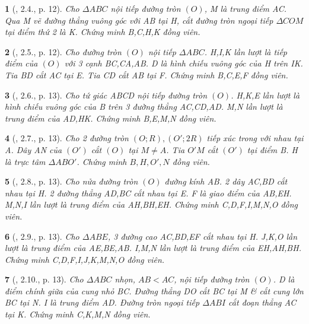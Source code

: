 \documentclass{article}
\newtheorem{baitoan}{}
\begin{document}
\begin{baitoan}[\cite{Thu_Chung_Viet_Minh_circ}, 2.4., p. 12]
	Cho $\Delta ABC$ nội tiếp đường tròn $(O)$, M là trung điểm AC. Qua M vẽ đường thẳng vuông góc với AB tại H, cắt đường tròn ngoại tiếp $\Delta COM$ tại điểm thứ 2 là K. Chứng minh B,C,H,K đồng viên.
\end{baitoan}

\begin{baitoan}[\cite{Thu_Chung_Viet_Minh_circ}, 2.5., p. 12]
	Cho đường tròn $(O)$ nội tiếp $\Delta ABC$. H,I,K lần lượt là tiếp điểm của $(O)$ với 3 cạnh BC,CA,AB. D là hình chiếu vuông góc của H trên IK. Tia BD cắt AC tại E. Tia CD cắt AB tại F. Chứng minh B,C,E,F đồng viên.
\end{baitoan}

\begin{baitoan}[\cite{Thu_Chung_Viet_Minh_circ}, 2.6., p. 13]
	Cho tứ giác ABCD nội tiếp đường tròn $(O)$. H,K,E lần lượt là hình chiếu vuông góc của B trên 3 đường thẳng AC,CD,AD. M,N lần lượt là trung điểm của AD,HK. Chứng minh B,E,M,N đồng viên.
\end{baitoan}

\begin{baitoan}[\cite{Thu_Chung_Viet_Minh_circ}, 2.7., p. 13]
	Cho 2 đường tròn $(O;R),(O';2R)$ tiếp xúc trong với nhau tại A. Dây AN của $(O')$ cắt $(O)$ tại $M\ne A$. Tia $O'M$ cắt $(O')$ tại điểm B. H là trực tâm $\Delta ABO'$. Chứng minh $B,H,O',N$ đồng viên.
\end{baitoan}

\begin{baitoan}[\cite{Thu_Chung_Viet_Minh_circ}, 2.8., p. 13]
	Cho nửa đường tròn $(O)$ đường kính AB. 2 dây AC,BD cắt nhau tại H. 2 đường thẳng AD,BC cắt nhau tại E. F là giao điểm của AB,EH. M,N,I lần lượt là trung điểm của AH,BH,EH. Chứng minh C,D,F,I,M,N,O đồng viên.
\end{baitoan}

\begin{baitoan}[\cite{Thu_Chung_Viet_Minh_circ}, 2.9., p. 13]
	Cho $\Delta ABE$, 3 đường cao AC,BD,EF cắt nhau tại H. J,K,O lần lượt là trung điểm của AE,BE,AB. I,M,N lần lượt là trung điểm của EH,AH,BH. Chứng minh C,D,F,I,J,K,M,N,O đồng viên.
\end{baitoan}

\begin{baitoan}[\cite{Thu_Chung_Viet_Minh_circ}, 2.10., p. 13]
	Cho $\Delta ABC$ nhọn, $AB < AC$, nội tiếp đường tròn $(O)$. D là điểm chính giữa của cung nhỏ BC. Đường thẳng DO cắt BC tại M \& cắt cung lớn BC tại N. I là trung điểm AD. Đường tròn ngoại tiếp $\Delta ABI$ cắt đoạn thẳng AC tại K. Chứng minh C,K,M,N đồng viên.
\end{baitoan}
\end{document}
